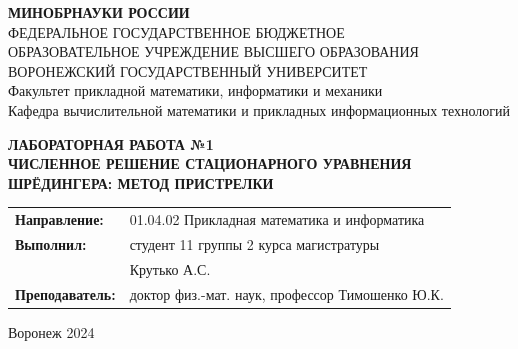 \documentclass[a4paper,12pt]{article}
\begin{document}

\lstset{style=pythonStyle}

\pagestyle{empty}

\begin{center}
\textbf{МИНОБРНАУКИ РОССИИ}\\
ФЕДЕРАЛЬНОЕ ГОСУДАРСТВЕННОЕ БЮДЖЕТНОЕ \\
ОБРАЗОВАТЕЛЬНОЕ УЧРЕЖДЕНИЕ ВЫСШЕГО ОБРАЗОВАНИЯ \\
ВОРОНЕЖСКИЙ ГОСУДАРСТВЕННЫЙ УНИВЕРСИТЕТ \\
Факультет прикладной математики, информатики и механики\\
Кафедра вычислительной математики и прикладных информационных технологий
\end{center}

\vspace{2cm}
\begin{center}
\textbf{ЛАБОРАТОРНАЯ РАБОТА №1}\\
\textbf{ЧИСЛЕННОЕ РЕШЕНИЕ СТАЦИОНАРНОГО УРАВНЕНИЯ ШРЁДИНГЕРА: МЕТОД ПРИСТРЕЛКИ}
\end{center}

\vspace{3cm}
\begin{flushright}
\begin{tabular}{l l}
\textbf{Направление:} & 01.04.02 \textendash{} Прикладная математика и информатика \\
\textbf{Выполнил:} & студент 11 группы 2 курса магистратуры \\
& Крутько А.С. \\
\textbf{Преподаватель:} & доктор физ.-мат. наук, профессор Тимошенко Ю.К.
\end{tabular}
\end{flushright}

\vspace{3cm}
\begin{center}
Воронеж 2024
\end{center}
\end{document}
